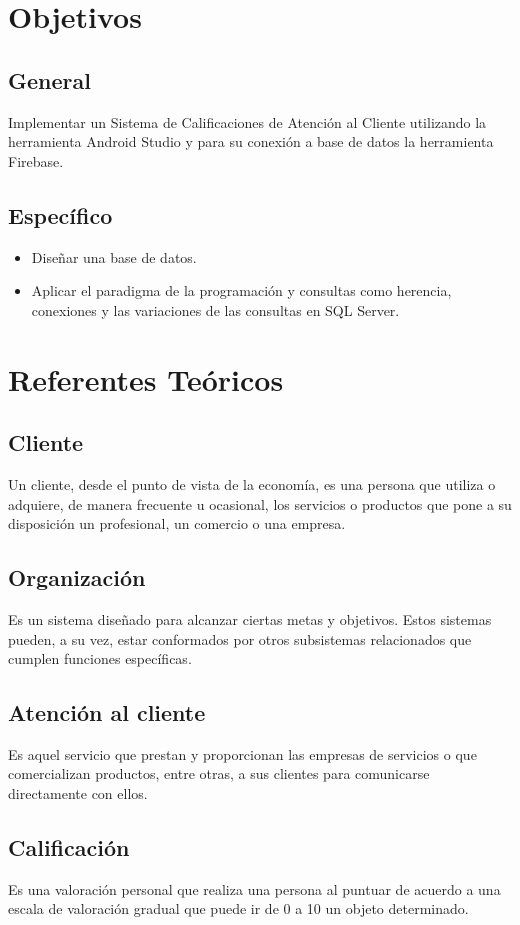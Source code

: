 \documentclass[preprint,12pt]{elsarticle}
\begin{document}
\section{Objetivos}
	\subsection{General }	
		Implementar un Sistema de Calificaciones de Atención al Cliente utilizando la herramienta Android Studio y para su conexión a base de datos la herramienta Firebase.
	\subsection{Específico }	

\begin{itemize}
	\item Diseñar una base de datos.
	\item Aplicar el paradigma  de la programación y consultas como herencia, conexiones y las variaciones de las consultas en SQL Server.
\end{itemize}


\section{Referentes Teóricos}
\subsection{Cliente}
Un cliente, desde el punto de vista de la economía, es una persona que utiliza o adquiere, de manera frecuente u ocasional, los servicios o productos que pone a su disposición un profesional, un comercio o una empresa.
\subsection{Organización}
Es un sistema diseñado para alcanzar ciertas metas y objetivos. Estos sistemas pueden, a su vez, estar conformados por otros subsistemas relacionados que cumplen funciones específicas.
\subsection{Atención al cliente}
Es aquel servicio que prestan y proporcionan las empresas de servicios o que comercializan productos, entre otras, a sus clientes para comunicarse directamente con ellos.
\subsection{Calificación}
Es una valoración personal que realiza una persona al puntuar de acuerdo a una escala de valoración gradual que puede ir de 0 a 10 un objeto determinado.
\end{document}
